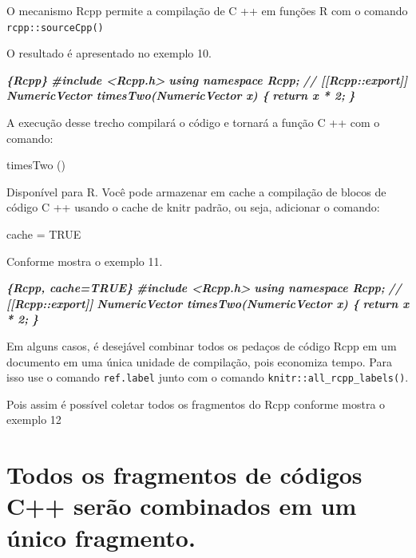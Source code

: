 \documentclass[
]{book}
\newenvironment{Shaded}{\begin{snugshade}}{\end{snugshade}}
\newcommand{\InformationTok}[1]{\textcolor[rgb]{0.56,0.35,0.01}{\textbf{\textit{#1}}}}
\begin{document}
O mecanismo Rcpp permite a compilação de C ++ em funções R com o comando \texttt{rcpp::sourceCpp()}

O resultado é apresentado no exemplo 10.

\begin{Shaded}
\begin{Highlighting}[]
 \InformationTok{\textasciigrave{}\textasciigrave{}\textasciigrave{}\{Rcpp\}}
\InformationTok{\#include \textless{}Rcpp.h\textgreater{}}
\InformationTok{using namespace Rcpp;}
\InformationTok{// [[Rcpp::export]]}
\InformationTok{NumericVector timesTwo(NumericVector x) \{}
\InformationTok{return x * 2;}
\InformationTok{\}}
\InformationTok{\textasciigrave{}\textasciigrave{}\textasciigrave{}}
\end{Highlighting}
\end{Shaded}

A execução desse trecho compilará o código e tornará a função C ++ com o comando:

timesTwo ()

Disponível para R. Você pode armazenar em cache a compilação de blocos de código C ++ usando o cache de knitr padrão, ou seja, adicionar o comando:

cache = TRUE

Conforme mostra o exemplo 11.

\begin{Shaded}
\begin{Highlighting}[]
 \InformationTok{\textasciigrave{}\textasciigrave{}\textasciigrave{}\{Rcpp, cache=TRUE\}}
\InformationTok{\#include \textless{}Rcpp.h\textgreater{}}
\InformationTok{using namespace Rcpp;}
\InformationTok{// [[Rcpp::export]]}
\InformationTok{NumericVector timesTwo(NumericVector x) \{}
\InformationTok{return x * 2;}
\InformationTok{\}}
\InformationTok{\textasciigrave{}\textasciigrave{}\textasciigrave{}}
\end{Highlighting}
\end{Shaded}

Em alguns casos, é desejável combinar todos os pedaços de código Rcpp em um documento em uma única unidade de compilação, pois economiza tempo. Para isso use o comando \texttt{ref.label} junto com o comando \texttt{knitr::all\_rcpp\_labels()}.

Pois assim é possível coletar todos os fragmentos do Rcpp conforme mostra o exemplo 12

\hypertarget{todos-os-fragmentos-de-cuxf3digos-c-seruxe3o-combinados-em-um-uxfanico-fragmento.}{%
\section{Todos os fragmentos de códigos C++ serão combinados em um único fragmento.}\label{todos-os-fragmentos-de-cuxf3digos-c-seruxe3o-combinados-em-um-uxfanico-fragmento.}}
\end{document}
